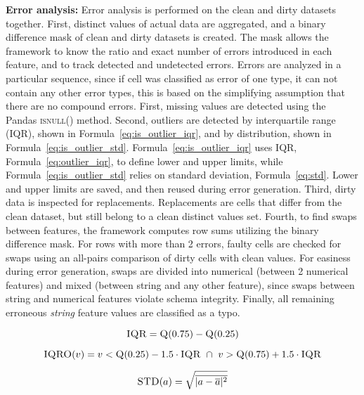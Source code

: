 \textbf{Error analysis:} 
Error analysis is performed on the clean and dirty datasets together.
First, distinct values of actual data are aggregated, and a binary difference mask of clean and dirty datasets is created.
The mask allows the framework to know the ratio and exact number of errors introduced in each feature, and to track detected and undetected errors. 
Errors are analyzed in a particular sequence, since if cell was classified as error of one type, it can not contain any other error types, this is based on the simplifying assumption that there are no compound errors.
First, missing values are detected using the Pandas \textsc{isnull()} method. 
Second, outliers are detected by interquartile range (IQR), shown in Formula~\ref{eq:is_outlier_iqr}, and by distribution, shown in Formula~\ref{eq:is_outlier_std}. 
Formula~\ref{eq:is_outlier_iqr} uses IQR, Formula~\ref{eq:outlier_iqr}, to define lower and upper limits, while Formula~\ref{eq:is_outlier_std} relies on standard deviation, Formula~\ref{eq:std}. 
Lower and upper limits are saved, and then reused during error generation. 
Third, dirty data is inspected for replacements. 
Replacements are cells that differ from the clean dataset, but still belong to a clean distinct values set.
Fourth, to find swaps between features, the framework computes row sums utilizing the binary difference mask. 
For rows with more than 2 errors, faulty cells are checked for swaps using an all-pairs comparison of dirty cells with clean values. 
For easiness during error generation, swaps are divided into numerical (between 2 numerical features) and mixed (between string and any other feature), since swaps between string and numerical features violate schema integrity.
Finally, all remaining erroneous \emph{string} feature values are classified as a typo.

\begin{equation}
\label{eq:outlier_iqr}
\textsc{IQR} = \textsc{Q}(0.75) - \textsc{Q}(0.25)  
\end{equation}

\begin{equation}
\label{eq:is_outlier_iqr}
\textsc{IQRO}(v) =  v < \textsc{Q}(0.25) - 1.5 \cdot \textsc{IQR} \ \cap \  v >  \textsc{Q}(0.75) + 1.5 \cdot \textsc{IQR}
\end{equation}

\begin{equation}
    \label{eq:std}
    \textsc{STD}(a) = \sqrt{\overline{|a - \overline{a}|^2}} 
\end{equation}

